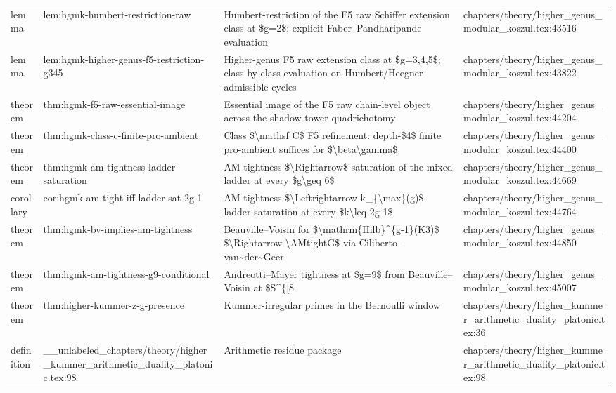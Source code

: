 \documentclass[11pt]{article}
\begin{document}
\begin{longtable}{L{0.10\textwidth}L{0.26\textwidth}L{0.42\textwidth}L{0.22\textwidth}}
lemma & lem:hgmk-humbert-restriction-raw & Humbert-restriction of the F5 raw Schiffer extension class at \$g=2\$; explicit Faber--Pandharipande evaluation & chapters/theory/higher\_genus\_modular\_koszul.tex:43516\\
lemma & lem:hgmk-higher-genus-f5-restriction-g345 & Higher-genus F5 raw extension class at \$g=3,4,5\$; class-by-class evaluation on Humbert/Heegner admissible cycles & chapters/theory/higher\_genus\_modular\_koszul.tex:43822\\
theorem & thm:hgmk-f5-raw-essential-image & Essential image of the F5 raw chain-level object across the shadow-tower quadrichotomy & chapters/theory/higher\_genus\_modular\_koszul.tex:44204\\
theorem & thm:hgmk-class-c-finite-pro-ambient & Class \$\textbackslash{}mathsf C\$ F5 refinement: depth-\$4\$ finite pro-ambient suffices for \$\textbackslash{}beta\textbackslash{}gamma\$ & chapters/theory/higher\_genus\_modular\_koszul.tex:44400\\
theorem & thm:hgmk-am-tightness-ladder-saturation & AM tightness \$\textbackslash{}Rightarrow\$ saturation of the mixed ladder at every \$g\textbackslash{}geq 6\$ & chapters/theory/higher\_genus\_modular\_koszul.tex:44669\\
corollary & cor:hgmk-am-tight-iff-ladder-sat-2g-1 & AM tightness \$\textbackslash{}Leftrightarrow k\_\{\textbackslash{}max\}(g)\$-ladder saturation at every \$k\textbackslash{}leq 2g-1\$ & chapters/theory/higher\_genus\_modular\_koszul.tex:44764\\
theorem & thm:hgmk-bv-implies-am-tightness & Beauville--Voisin for \$\textbackslash{}mathrm\{Hilb\}\textasciicircum{}\{g-1\}(K3)\$ \$\textbackslash{}Rightarrow \textbackslash{}AMtightG\$ via Ciliberto--van\textasciitilde{}der\textasciitilde{}Geer & chapters/theory/higher\_genus\_modular\_koszul.tex:44850\\
theorem & thm:hgmk-am-tightness-g9-cond{}itional & Andreotti--Mayer tightness at \$g=9\$ from Beauville--Voisin at \$S\textasciicircum{}\{[8 & chapters/theory/higher\_genus\_modular\_koszul.tex:45007\\
theorem & thm:higher-kummer-z-g-presence & Kummer-irregular primes in the Bernoulli window & chapters/theory/higher\_kummer\_arithmetic\_duality\_platonic.tex:36\\
definition & \_\_unlabeled\_chapters/theory/higher\_kummer\_arithmetic\_duality\_platonic.tex:98 & Arithmetic residue package & chapters/theory/higher\_kummer\_arithmetic\_duality\_platonic.tex:98\\

\end{longtable}
\end{document}
